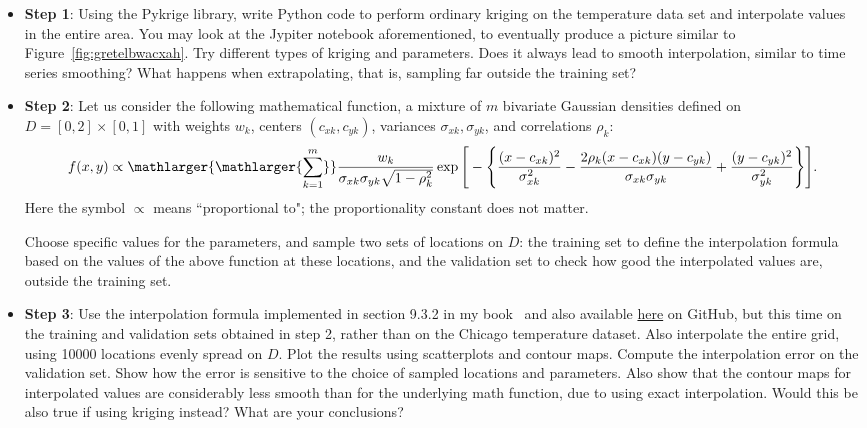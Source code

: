 \documentclass[oneside,10pt]{book}
\begin{document}
\begin{itemize}
\item[] {\bf Step 1}:  Using the Pykrige library, write Python code to perform ordinary kriging on the temperature data set and interpolate values in the entire area. You may look at the Jypiter notebook aforementioned, to eventually produce a picture similar to Figure~\ref{fig:gretelbwacxah}. Try different types of kriging and parameters. Does it always lead to smooth interpolation, similar to time series smoothing? What happens when extrapolating, that is, sampling far outside the training set? \\
\item[] {\bf Step 2}: Let us consider the following mathematical function,  a mixture of $m$ bivariate Gaussian densities defined on $D = [0, 2] \times [0, 1]$ with weights $w_k$, centers
 $(c_{xk}, c_{yk})$, variances $\sigma_{xk},\sigma_{yk}$, and correlations $\rho_k$:
\begin{equation}
f(x, y) \propto \mathlarger{\mathlarger{\sum_{k=1}^m}} \frac{w_k}{\sigma_{xk} \sigma_{yk}\sqrt{1-\rho_k^2}}
\exp\Bigg[-\Bigg\{\frac{(x-c_{xk})^2}{\sigma_{xk}^2}
-  \frac{2\rho_k(x-c_{xk})(y-c_{yk})}{\sigma_{xk}\sigma_{yk}}
+ \frac{(y-c_{yk})^2}{\sigma_{yk}^2}
\Bigg\}\Bigg]. \label{pov4dh}
\end{equation}
Here the symbol $\propto$ means ``proportional to"; the proportionality constant does not matter.

Choose specific values for the parameters, and sample two sets of locations on $D$: the training set to define the interpolation formula based on the values of the above function at these locations, and the validation set to check how good the interpolated values are, outside the training set.\vspace{1ex}

\item[] {\bf Step 3}: Use the interpolation formula implemented in section 9.3.2 in my book~\cite{vgelsevier} and also available \href{https://github.com/VincentGranville/Statistical-Optimization/blob/main/interpol.py}{here} on GitHub, but this time on the training and validation sets obtained in step 2, rather than on the Chicago temperature dataset. Also interpolate the entire grid, using \num{10000} locations evenly spread
 on $D$. Plot the results using scatterplots and contour maps. Compute the interpolation error on the validation set. Show how the error is sensitive to the choice of sampled locations and parameters. Also show that the contour maps for interpolated values are considerably less smooth than for the underlying math function, due to using exact interpolation. Would this be also true if using kriging instead? What are your conclusions? \vspace{1ex}


\end{itemize}
\end{document}
